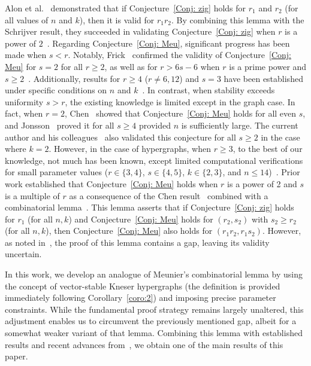 \documentclass[preprint,12pt,3p]{elsarticle}
\begin{document}
Alon et al.~\cite[Lemma 3.3]{Alon2009} demonstrated that if Conjecture~\ref{Conj: zig} holds for $r_1$ and $r_2$ (for all values of $n$ and $k$), then it is valid for $r_1r_2$. By combining this lemma with the Schrijver result, they succeeded in validating Conjecture~\ref{Conj: zig} when $r$ is a power of $2$~\cite[Corollary 3.4]{Alon2009}. Regarding Conjecture~\ref{Conj: Meu}, significant progress has been made when $s < r$. Notably, Frick~\cite[Theorem 1.1]{frick2020chromatic} confirmed the validity of Conjecture~\ref{Conj: Meu} for $s = 2$ for all $r \geq 2$, as well as for $ r > 6s-6$ when $r$ is a prime power and $s \geq 2$~\cite[Theorem 1.4]{frick2020chromatic}. Additionally, results for $r \geq 4$ ($r\neq 6, 12$) and $s = 3$ have been established under specific conditions on $n$ and $k$~\cite[Theorem 3.8]{frick2020chromatic}. In contrast, when stability exceeds uniformity $s > r$, the existing knowledge is limited except in the graph case. In fact, when $r=2$, Chen~\cite{chen2015multichromatic} showed that Conjecture~\ref{Conj: Meu} holds for all even $s$, and Jonsson~\cite{jonsson2012chromatic} proved it for all $s \geq 4$ provided $n$ is sufficiently large. The current author and his colleagues~\cite{daneshpajouh2021colorings} also validated this conjecture for all $s \geq 2$ in the case where $k = 2$. However, in the case of hypergraphs, when $r\geq 3$, to the best of our knowledge, not much has been known, except limited computational verifications for small parameter values ($r \in \{3,4\}$, $s \in \{4,5\}$, $k \in \{2,3\}$, and $n \leq 14$)~\cite{Me11}. Prior work established that Conjecture~\ref{Conj: Meu} holds when $r$ is a power of 2 and $s$ is a multiple of $r$ as a consequence of the Chen result~\cite[Corollary 5]{chen2015multichromatic} combined with a combinatorial lemma~\cite[Lemma 4]{Me11}. This lemma asserts that if Conjecture~\ref{Conj: zig} holds for $r_1$ (for all $n,k$) and Conjecture~\ref{Conj: Meu} holds for $(r_2,s_2)$ with $s_2 \geq r_2$ (for all $n,k$), then Conjecture~\ref{Conj: Meu} also holds for $(r_1r_2, r_1s_2)$. However, as noted in~\cite{Meunier-website}, the proof of this lemma contains a gap, leaving its validity uncertain.

In this work, we develop an analogue of Meunier's combinatorial lemma by using the concept of vector-stable Kneser hypergraphs (the definition is provided immediately following Corollary~\ref{coro:2}) and imposing precise parameter constraints.
While the fundamental proof strategy remains largely unaltered, this adjustment enables us to circumvent the previously mentioned gap, albeit for a somewhat weaker variant of that lemma. Combining this lemma with established results and recent advances from~\cite{daneshpajouh2021neighborhood, daneshpajouh2021colorings}, we obtain one of the main results of this paper.
\end{document}
